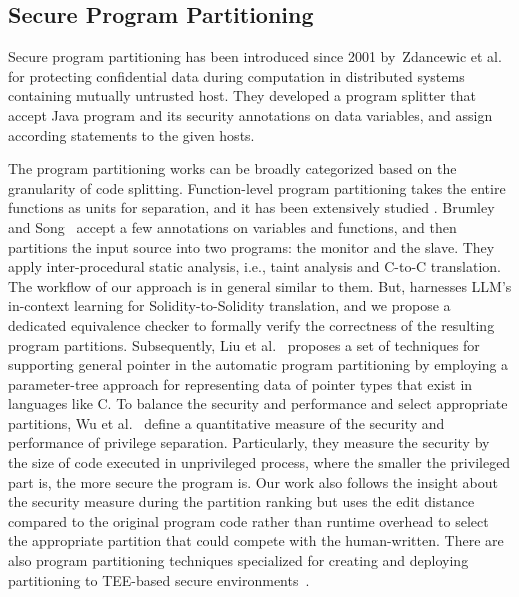 \subsection{Secure Program Partitioning}
Secure program partitioning has been introduced since 2001 by~Zdancewic et al.~\cite{zdancewic2002secure} for protecting confidential data during computation in distributed systems containing mutually untrusted host.
They developed a program splitter that accept Java program and its security annotations on data variables, and assign according statements to the given hosts.

The program partitioning works can be broadly categorized based on the granularity of code splitting.
Function-level program partitioning takes the entire functions as units for separation, and it has been extensively studied \cite{brumley2004privtrans, liu2017ptrsplit, wu2013automatically, liu2015thwarting, ghosn2019secured, santos2014using, rubinov2016automated, gudka2015clean, song2016enforcing}.
Brumley and Song~\cite{brumley2004privtrans} accept a few annotations on variables and functions, and then partitions the input source into two programs: the monitor and the slave.
They apply inter-procedural static analysis, i.e., taint analysis and C-to-C translation.
The workflow of our approach is in general similar to them. But, \tool harnesses LLM's in-context learning for Solidity-to-Solidity translation, and we propose a dedicated equivalence checker to formally verify the correctness of the resulting program partitions. 
Subsequently, 
Liu et al.~\cite{liu2017ptrsplit} proposes a set of techniques for supporting general pointer in the automatic program partitioning by employing a parameter-tree approach for representing data of pointer types that exist in languages like C. 
To balance the security and performance and select appropriate partitions, Wu et al.~\cite{wu2013automatically} define a quantitative measure of the security
and performance of privilege separation.
Particularly, they measure the security by the size of code executed in unprivileged process, where the smaller the privileged part is,
the more secure the program is.
Our work also follows the insight about the security measure during the partition ranking but \tool uses the edit distance compared to the original program code rather than runtime overhead to select the appropriate partition that could compete with the human-written.
There are also program partitioning techniques specialized for creating and deploying partitioning to TEE-based secure environments~\cite{liu2015thwarting, santos2014using, ghosn2019secured, rubinov2016automated, lind2017glamdring}.
